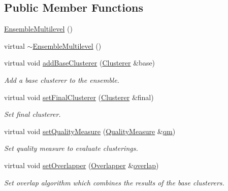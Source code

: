 \subsection*{Public Member Functions}
\begin{DoxyCompactItemize}
\item 
\hyperlink{class_ensemble_clustering_1_1_ensemble_multilevel_afcc3bde4f78125af56d8a07591bc7a79}{Ensemble\-Multilevel} ()
\item 
virtual \hyperlink{class_ensemble_clustering_1_1_ensemble_multilevel_ab31fe3caeeb302e9278f7f9887d72a38}{$\sim$\-Ensemble\-Multilevel} ()
\item 
virtual void \hyperlink{class_ensemble_clustering_1_1_ensemble_multilevel_a9b07e585d4d1b618de09cc0788f0f06a}{add\-Base\-Clusterer} (\hyperlink{class_ensemble_clustering_1_1_clusterer}{Clusterer} \&base)
\begin{DoxyCompactList}\small\item\em Add a base clusterer to the ensemble. \end{DoxyCompactList}\item 
virtual void \hyperlink{class_ensemble_clustering_1_1_ensemble_multilevel_a24a9f848556af3d58978c7b1a144cfdb}{set\-Final\-Clusterer} (\hyperlink{class_ensemble_clustering_1_1_clusterer}{Clusterer} \&final)
\begin{DoxyCompactList}\small\item\em Set final clusterer. \end{DoxyCompactList}\item 
virtual void \hyperlink{class_ensemble_clustering_1_1_ensemble_multilevel_a2685958be0a4b56fe5f1719ef603ed4a}{set\-Quality\-Measure} (\hyperlink{class_ensemble_clustering_1_1_quality_measure}{Quality\-Measure} \&\hyperlink{class_ensemble_clustering_1_1_ensemble_multilevel_a15b2fa011c34bb8c2ea0125b22530eb0}{qm})
\begin{DoxyCompactList}\small\item\em Set quality measure to evaluate clusterings. \end{DoxyCompactList}\item 
virtual void \hyperlink{class_ensemble_clustering_1_1_ensemble_multilevel_a41d1c8b828f043f79cdb7925b71fb771}{set\-Overlapper} (\hyperlink{class_ensemble_clustering_1_1_overlapper}{Overlapper} \&\hyperlink{class_ensemble_clustering_1_1_ensemble_multilevel_a14fc679b06a378edbda2fe0b77c831b0}{overlap})
\begin{DoxyCompactList}\small\item\em Set overlap algorithm which combines the results of the base clusterers. \end{DoxyCompactList}\item 

\end{DoxyCompactItemize}
